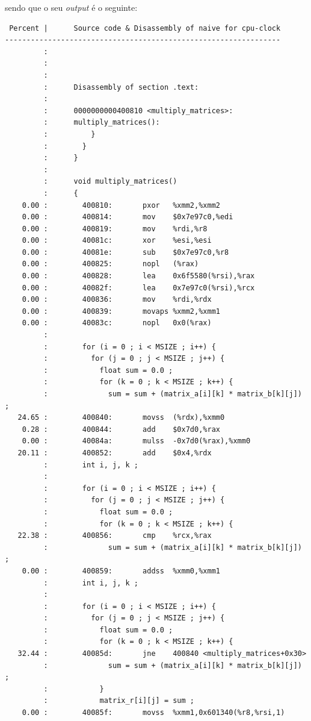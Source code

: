 \documentclass[conference,compsoc]{IEEEtran}
\begin{document}
sendo que o seu \textit{output} é o seguinte:

\begin{lstlisting}
 Percent |      Source code & Disassembly of naive for cpu-clock
----------------------------------------------------------------
         :
         :
         :
         :      Disassembly of section .text:
         :
         :      0000000000400810 <multiply_matrices>:
         :      multiply_matrices():
         :          }
         :        }
         :      }
         :       
         :      void multiply_matrices()
         :      {
    0.00 :        400810:       pxor   %xmm2,%xmm2
    0.00 :        400814:       mov    $0x7e97c0,%edi
    0.00 :        400819:       mov    %rdi,%r8
    0.00 :        40081c:       xor    %esi,%esi
    0.00 :        40081e:       sub    $0x7e97c0,%r8
    0.00 :        400825:       nopl   (%rax)
    0.00 :        400828:       lea    0x6f5580(%rsi),%rax
    0.00 :        40082f:       lea    0x7e97c0(%rsi),%rcx
    0.00 :        400836:       mov    %rdi,%rdx
    0.00 :        400839:       movaps %xmm2,%xmm1
    0.00 :        40083c:       nopl   0x0(%rax)
         :       
         :        for (i = 0 ; i < MSIZE ; i++) {
         :          for (j = 0 ; j < MSIZE ; j++) {
         :            float sum = 0.0 ;
         :            for (k = 0 ; k < MSIZE ; k++) {
         :              sum = sum + (matrix_a[i][k] * matrix_b[k][j]) ;
   24.65 :        400840:       movss  (%rdx),%xmm0
    0.28 :        400844:       add    $0x7d0,%rax
    0.00 :        40084a:       mulss  -0x7d0(%rax),%xmm0
   20.11 :        400852:       add    $0x4,%rdx
         :        int i, j, k ;
         :       
         :        for (i = 0 ; i < MSIZE ; i++) {
         :          for (j = 0 ; j < MSIZE ; j++) {
         :            float sum = 0.0 ;
         :            for (k = 0 ; k < MSIZE ; k++) {
   22.38 :        400856:       cmp    %rcx,%rax
         :              sum = sum + (matrix_a[i][k] * matrix_b[k][j]) ;
    0.00 :        400859:       addss  %xmm0,%xmm1
         :        int i, j, k ;
         :       
         :        for (i = 0 ; i < MSIZE ; i++) {
         :          for (j = 0 ; j < MSIZE ; j++) {
         :            float sum = 0.0 ;
         :            for (k = 0 ; k < MSIZE ; k++) {
   32.44 :        40085d:       jne    400840 <multiply_matrices+0x30>
         :              sum = sum + (matrix_a[i][k] * matrix_b[k][j]) ;
         :            }
         :            matrix_r[i][j] = sum ;
    0.00 :        40085f:       movss  %xmm1,0x601340(%r8,%rsi,1)

\end{lstlisting}
\end{document}

